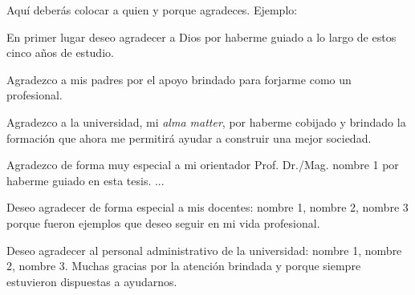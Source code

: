 \begin{agradecimientos}
Aquí deberás colocar a quien y porque agradeces. Ejemplo:

En primer lugar deseo agradecer a Dios por haberme guiado a lo largo de estos cinco años de estudio.

Agradezco a mis padres por el apoyo brindado para forjarme como un profesional.

Agradezco a la universidad, mi \textit{alma matter}, por haberme cobijado y brindado la formación que ahora me permitirá ayudar a construir una mejor sociedad.

Agradezco de forma muy especial a mi orientador Prof. Dr./Mag. nombre 1 por haberme guiado en esta tesis. ...

Deseo agradecer de forma especial a mis docentes: nombre 1, nombre 2, nombre 3 porque fueron ejemplos que deseo seguir en mi vida profesional.

Deseo agradecer al personal administrativo de la universidad: nombre 1, nombre 2, nombre 3. Muchas gracias por la atención brindada y porque siempre estuvieron dispuestas a ayudarnos.
\end{agradecimientos}
